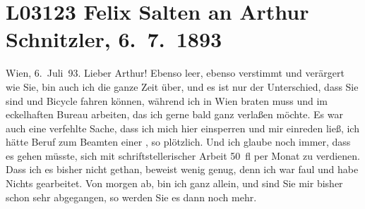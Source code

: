 

\section[Felix Salten an Arthur Schnitzler, 6. 7. 1893]{L03123 Felix Salten an Arthur Schnitzler, 6. 7. 1893}
\nopagebreak{}
\rehead{ }\normalsize\beginnumbering{}
\toendnotes[C]{\smallbreak\pagebreak[2]}
\toendnotes[C]{\smallbreak}
\pstart
           \raggedleft{}{\pb}Wien, 6. Juli 93.\pend
           \vspace{0.5em}
\pstart
           Lieber Arthur! Ebenso leer, ebenso verstimmt und
               verärgert wie Sie, bin auch ich die ganze Zeit über, und es ist nur der Unterschied,
               dass Sie \label{K_L03123-1v}\label{K_L03123-1} sind und Bicycle fahren können, während ich in Wien braten muss und im eckelhaften Bureau arbeiten, das ich gerne bald ganz
               verlaßen möchte. Es war auch eine verfehlte Sache, dass ich mich hier einsperren und
               mir einreden ließ, ich hätte Beruf zum Beamten einer \label{K_L03123-2v}\label{K_L03123-2}, so
               plötzlich. Und ich glaube noch immer, dass es gehen müsste, sich mit
               schriftstellerischer {\pb}Arbeit 50 fl
               per Monat zu verdienen. Dass ich es bisher nicht gethan, beweist wenig genug, denn
               ich war faul und habe Nichts gearbeitet. Von morgen
               ab, bin ich ganz allein, und sind Sie mir bisher schon sehr abgegangen, so werden Sie
               es dann noch mehr.\pend
           
